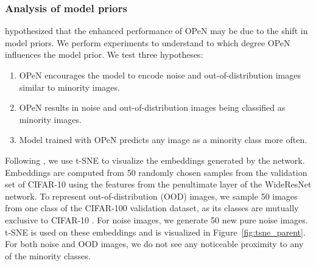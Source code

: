 



\subsubsection{Analysis of model priors}

\citet{PureNoise} hypothesized that the enhanced performance of OPeN may be due to the shift in model priors. We perform experiments to understand to which degree OPeN influences the model prior. We test three hypotheses:

\begin{enumerate}
    \item OPeN encourages the model to encode noise and out-of-distribution images similar to minority images.
    \item OPeN results in noise and out-of-distribution images being classified as minority images.
    \item Model trained with OPeN predicts any image as a minority class more often.
\end{enumerate}


Following \citet{M2m}, we use t-SNE \citep{tsne} to visualize the embeddings generated by the network. Embeddings are computed from 50 randomly chosen samples from the validation set of CIFAR-10 using the features from the penultimate layer of the WideResNet network. To represent out-of-distribution (OOD) images, we sample 50 images from one class of the CIFAR-100 validation dataset, as its classes are mutually exclusive to CIFAR-10 \cite{TinyImages}. For noise images, we generate 50 new pure noise images. t-SNE is used on these embeddings and is visualized in Figure~\ref{fig:tsne_parent}. For both noise and OOD images, we do not see any noticeable proximity to any of the minority classes.

